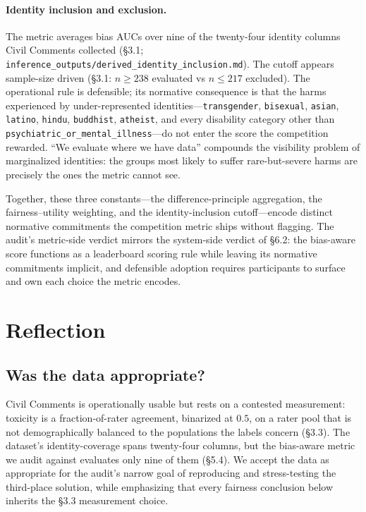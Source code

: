 \documentclass[11pt]{article}
\begin{document}
\paragraph{Identity inclusion and exclusion.} The metric averages bias AUCs over nine of the twenty-four identity columns Civil Comments collected (\S3.1; \texttt{inference\_outputs/derived\_identity\_inclusion.md}). The cutoff appears sample-size driven (\S3.1: $n \geq 238$ evaluated vs $n \leq 217$ excluded). The operational rule is defensible; its normative consequence is that the harms experienced by under-represented identities---\texttt{transgender}, \texttt{bisexual}, \texttt{asian}, \texttt{latino}, \texttt{hindu}, \texttt{buddhist}, \texttt{atheist}, and every disability category other than \texttt{psychiatric\_or\_mental\_illness}---do not enter the score the competition rewarded. ``We evaluate where we have data'' compounds the visibility problem of marginalized identities: the groups most likely to suffer rare-but-severe harms are precisely the ones the metric cannot see.

Together, these three constants---the difference-principle aggregation, the fairness--utility weighting, and the identity-inclusion cutoff---encode distinct normative commitments the competition metric ships without flagging. The audit's metric-side verdict mirrors the system-side verdict of \S6.2: the bias-aware score functions as a leaderboard scoring rule while leaving its normative commitments implicit, and defensible adoption requires participants to surface and own each choice the metric encodes.

\section{Reflection}

\subsection{Was the data appropriate?}

Civil Comments is operationally usable but rests on a contested measurement: toxicity is a fraction-of-rater agreement, binarized at $0.5$, on a rater pool that is not demographically balanced to the populations the labels concern (\S3.3). The dataset's identity-coverage spans twenty-four columns, but the bias-aware metric we audit against evaluates only nine of them (\S5.4). We accept the data as appropriate for the audit's narrow goal of reproducing and stress-testing the third-place solution, while emphasizing that every fairness conclusion below inherits the \S3.3 measurement choice.
\end{document}

